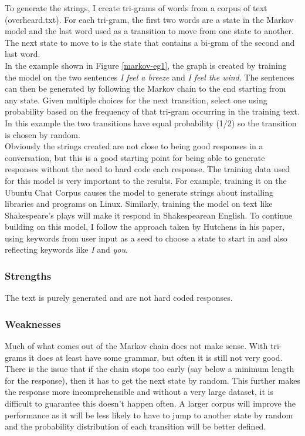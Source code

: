 \documentclass{article}
\newcommand{\n}[0]{\\[\baselineskip]}
\begin{document}
To generate the strings, I create tri-grams of words from a corpus of text (overheard.txt). For each tri-gram, the first two words are a state in the Markov model and the last word used as a transition to move from one state to another. The next state to move to is the state that contains a bi-gram of the second and last word.
\n
In the example shown in Figure \ref{markov-eg1}, the graph is created by training the model on the two sentences \textit{I feel a breeze} and \textit{I feel the wind}. The sentences can then be generated by following the Markov chain to the end starting from any state. Given multiple choices for the next transition, select one using probability based on the frequency of that tri-gram occurring in the training text. In this example the two transitions have equal probability (1/2) so the transition is chosen by random.
\n
Obviously the strings created are not close to being good responses in a conversation, but this is a good starting point for being able to generate responses without the need to hard code each response. The training data used for this model is very important to the results. For example, training it on the Ubuntu Chat Corpus causes the model to generate strings about installing libraries and programs on Linux. Similarly, training the model on text like Shakespeare's plays will make it respond in Shakespearean English. To continue building on this model, I follow the approach taken by Hutchens \cite{cheating} in his paper, using keywords from user input as a seed to choose a state to start in and also reflecting keywords like \textit{I} and \textit{you}.
\subsubsection{Strengths}
The text is purely generated and are not hard coded responses. 
\subsubsection{Weaknesses}
Much of what comes out of the Markov chain does not make sense. With tri-grams it does at least have some grammar, but often it is still not very good. There is the issue that if the chain stops too early (say below a minimum length for the response), then it has to get the next state by random. This further makes the response more incomprehensible and without a very large dataset, it is difficult to guarantee this doesn't happen often. A larger corpus will improve the performance as it will be less likely to have to jump to another state by random and the probability distribution of each transition will be better defined. 
\end{document}
